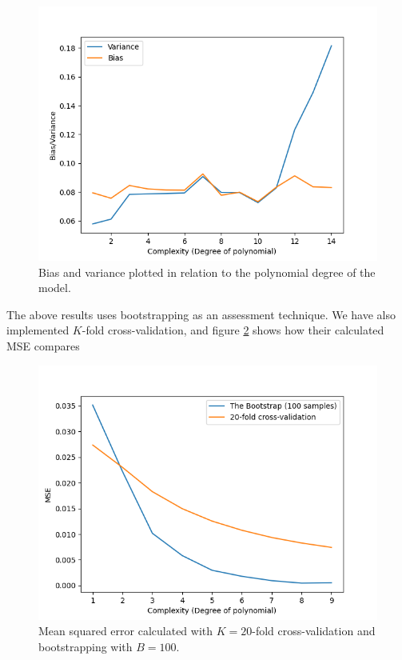 \documentclass[../main.tex]{subfiles}
\begin{document}
\begin{figure}[h]
    \centering
    \includegraphics[width=\textwidth]{../assets/var.png}
    \caption{Bias and variance plotted in relation to the polynomial degree of the model.}
    \label{fig:result_bias_variance}
\end{figure}

The above results uses bootstrapping as an assessment technique. We have also implemented $K$-fold cross-validation, and figure \ref{fig:result_cv_boot_mse} shows how their calculated MSE compares

\begin{figure}[h]
    \centering
    \includegraphics[width=\textwidth]{../assets/cv_boot_mse.png}
    \caption{Mean squared error calculated with $K=20$-fold cross-validation and bootstrapping with $B=100$.}
    \label{fig:result_cv_boot_mse}
\end{figure}
\end{document}
